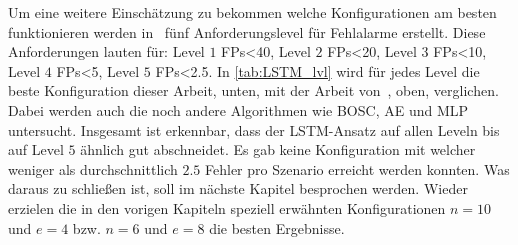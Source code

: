     Um eine weitere Einschätzung zu bekommen welche Konfigurationen am besten funktionieren werden in~\cite{IDSTHREADGRIMMER2021} fünf Anforderungslevel für Fehlalarme erstellt.
    Diese Anforderungen lauten für: Level $1$ \acp{FP}<40, Level $2$ \acp{FP}<20, Level $3$ \acp{FP}<10, Level $4$ \acp{FP}<5, Level $5$ \acp{FP}<2.5.
    In \autoref{tab:LSTM_lvl} wird für jedes Level die beste Konfiguration dieser Arbeit, unten, mit der Arbeit von~\cite{IDSTHREADGRIMMER2021}, oben, verglichen.
    Dabei werden auch die noch andere Algorithmen wie \ac{BOSC}, \ac{AE} und \ac{MLP} untersucht.
    Insgesamt ist erkennbar, dass der \ac{LSTM}-Ansatz auf allen Leveln bis auf Level $5$ ähnlich gut abschneidet.
    Es gab keine Konfiguration mit welcher weniger als durchschnittlich $2.5$ Fehler pro Szenario erreicht werden konnten.
    Was daraus zu schließen ist, soll im nächste Kapitel besprochen werden.
    Wieder erzielen die in den vorigen Kapiteln speziell erwähnten Konfigurationen $n=10$ und $e=4$ bzw. $n=6$ und $e=8$ die besten Ergebnisse.

